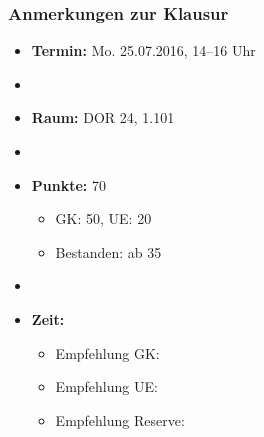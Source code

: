 \begin{frame}
\frametitle{Anmerkungen zur Klausur}

\begin{itemize}
	\item \textbf{Termin:} Mo. 25.07.2016, 14--16 Uhr
	\item[]
	
	\item \textbf{Raum:} DOR 24, 1.101
	\item[]

	\item \textbf{Punkte:} 70
	\begin{itemize}
		\item GK: 50, UE: 20
		\item Bestanden: ab 35
	\end{itemize}

	\item[]
	\item \textbf{Zeit:} 
	\begin{itemize}
		\item Empfehlung GK: 
		\item Empfehlung UE: 
		\item Empfehlung Reserve: 
	\end{itemize}		
\end{itemize}

\end{frame}


